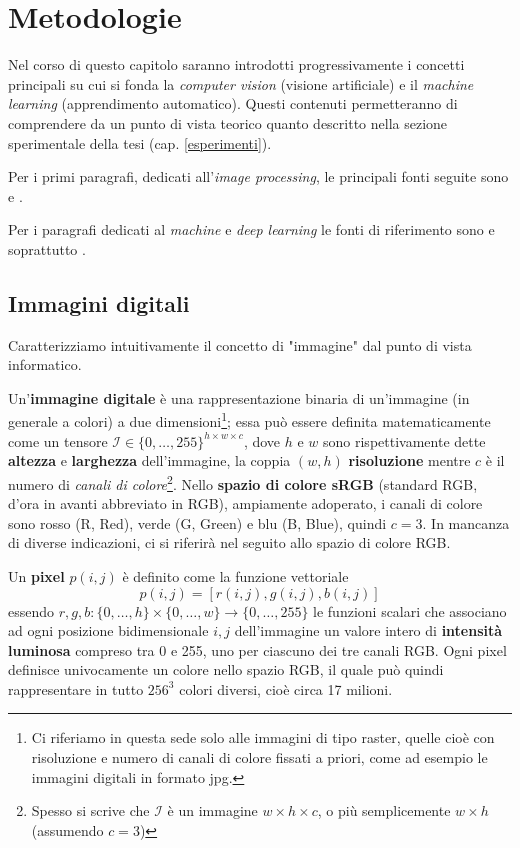 \chapter{Metodologie}
\label{teoria}
Nel corso di questo capitolo saranno introdotti progressivamente i concetti principali su cui si fonda la \textit{computer vision} (visione artificiale) e il \textit{machine learning} (apprendimento automatico). Questi contenuti permetteranno di comprendere da un punto di vista teorico quanto descritto nella sezione sperimentale della tesi (cap. \ref{esperimenti}).

Per i primi paragrafi, dedicati all'\textit{image processing}, le principali fonti seguite sono \cite{gianvito} e \cite{computerVision}.

Per i paragrafi dedicati al \textit{machine} e \textit{deep learning} le fonti di riferimento sono \cite{dlbook} e soprattutto \cite{cs231n}.


\section{Immagini digitali}
\label{imDig}
Caratterizziamo intuitivamente il concetto di "immagine" dal punto di vista informatico.

Un'\textbf{immagine digitale} è una rappresentazione binaria di un'immagine (in generale a colori) a due dimensioni\footnote{Ci riferiamo in questa sede solo alle immagini di tipo raster, quelle cioè con risoluzione e numero di canali di colore fissati a priori, come ad esempio le immagini digitali in formato jpg.}; essa può essere definita matematicamente come un tensore $\mathcal{I}\in\{0,\dots,255\}^{h\times w\times c}$, dove $h$ e $w$ sono rispettivamente dette \textbf{altezza} e \textbf{larghezza} dell'immagine, la coppia $(w,h)$ \textbf{risoluzione} mentre $c$ è il numero di \emph{canali di colore}\footnote{Spesso si scrive che $\mathcal{I}$ è un immagine $w\times h\times c$, o più semplicemente $w\times h$ (assumendo $c=3$)}. Nello \textbf{spazio di colore sRGB} (standard RGB, d'ora in avanti abbreviato in RGB), ampiamente adoperato, i canali di colore sono rosso (R, Red), verde (G, Green) e blu (B, Blue), quindi $c=3$. In mancanza di diverse indicazioni, ci si riferirà nel seguito allo spazio di colore RGB.

Un \textbf{pixel} $p(i,j)$ è definito come la funzione vettoriale
\[p(i,j)=[r(i,j),g(i,j),b(i,j)]\]
essendo $r,g,b:\{0,\dots,h\}\times\{0,\dots,w\}\to\{0,\dots,255\}$ le funzioni scalari che associano ad ogni posizione bidimensionale $i,j$ dell'immagine un valore intero di \textbf{intensità luminosa} compreso tra 0 e 255, uno per ciascuno dei tre canali RGB.
Ogni pixel definisce univocamente un colore nello spazio RGB, il quale può quindi rappresentare in tutto $256^{3}$ colori diversi, cioè circa 17 milioni.

